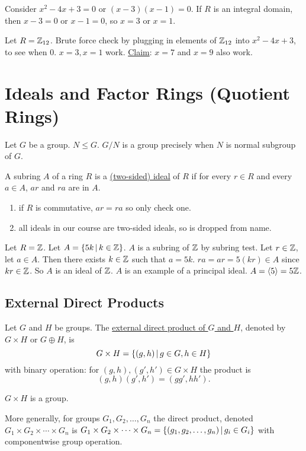 \documentclass[]{article}
\begin{document}
Consider $x^2-4x+3=0$ or $(x-3)(x-1)=0$.
If $R$ is an integral domain, then $x-3=0$ or $x-1=0$, so $x=3$ or $x=1$.
\begin{example}
	Let $R=\mathbb{Z}_{12}$. Brute force check by plugging in elements of $\mathbb{Z}_{12}$ into $x^2-4x+3$, to see when 0. $x=3,x=1$ work.
	\ul{Claim}: $x=7$ and $x=9$ also work.
\end{example}

\section{Ideals and Factor Rings (Quotient Rings)}
Let $G$ be a group. $N\leq G$. $G/N$ is a group precisely when $N$ is normal subgroup of $G$.
\begin{definition}
	A subring $A$ of a ring $R$ is a \ul{(two-sided) ideal} of $R$ if for every $r\in R$ and every $a\in A$, $ar$ and $ra$ are in $A$.
\end{definition}
\begin{remark}
	\begin{enumerate}
		\item if $R$ is commutative, $ar=ra$ so only check one.
		\item all ideals in our course are two-sided ideals, so  is dropped from name.
	\end{enumerate}
\end{remark}
\begin{example}
	Let $R=\mathbb{Z}$. Let $A=\left\{ 5k \, \middle| \, k\in\mathbb{Z} \right\}$. $A$ is a subring of $\mathbb{Z}$ by subring test.
	Let $r\in\mathbb{Z}$, let $a\in A$. Then there exists $k\in\mathbb{Z}$ such that $a=5k$. $ra=ar=5(kr)\in A$ since $kr\in\mathbb{Z}$.
	So $A$ is an ideal of $\mathbb{Z}$.
	$A$ is an example of a principal ideal. $A=\left\langle 5 \right\rangle=5\mathbb{Z}$.
\end{example}

\subsection{External Direct Products}

Let $G$ and $H$ be groups. The \ul{external direct product of $G$ and $H$}, denoted by $G\times H$ or $G\oplus H$, is
$$ G\times H = \left\{ (g,h) \, \middle| \, g\in G,h\in H \right\}$$
with binary operation: for $(g,h),(g',h')\in G\times H$ the product is $$(g,h)(g',h') = (gg',hh').$$
\begin{xca}
	$G\times H$ is a group.
\end{xca}
More generally, for groups $G_1,G_2,\dots,G_n$ the direct product, denoted $G_1\times G_2\times\cdots\times G_n$ is $G_1\times G_2\times\cdots\times G_n = \left\{ (g_1,g_2,\dots,g_n) \, \middle| \, g_i\in G_i \right\}$ with componentwise group operation.
\end{document}
